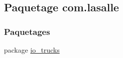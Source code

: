 \hypertarget{namespacecom_1_1lasalle}{}\subsection{Paquetage com.\+lasalle}
\label{namespacecom_1_1lasalle}
\subsubsection*{Paquetages}
\begin{DoxyCompactItemize}
\item 
package \hyperlink{namespacecom_1_1lasalle_1_1io__trucks}{io\+\_\+trucks}
\end{DoxyCompactItemize}
